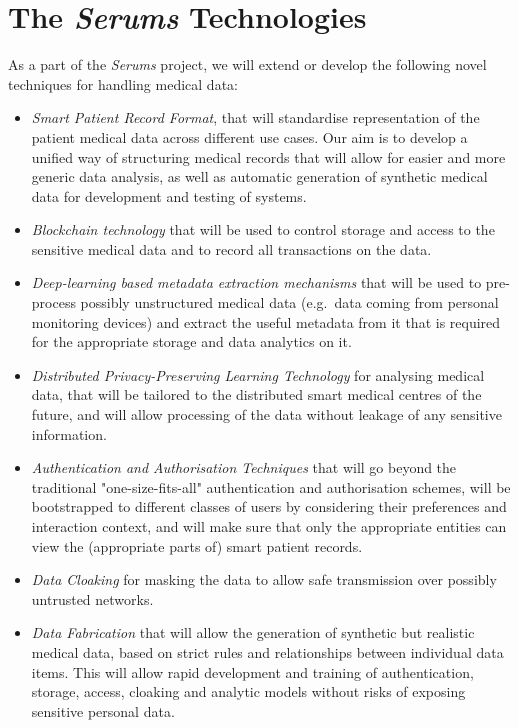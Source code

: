 \documentclass[sigconf]{acmart}
\begin{document}

\section{The \emph{Serums} Technologies}
\noindent
As a part of the \emph{Serums} project, we will extend or develop the following novel techniques for handling medical data:
\begin{itemize}
\item \emph{Smart Patient Record Format}, that will standardise representation of the patient medical data across different use cases. Our aim is to develop a unified way of structuring medical records that will allow for easier and more generic data analysis, as well as automatic generation of synthetic medical data for development and testing of systems.
\item \emph{Blockchain technology} that will be used to control storage and access to the sensitive medical data and to record all transactions on the data.
\item \emph{Deep-learning based metadata extraction mechanisms} that will be used to pre-process possibly unstructured medical data (e.g.~data coming from personal monitoring devices) and extract the useful metadata from it that is required for the appropriate storage and data analytics on it.
\item \emph{Distributed Privacy-Preserving Learning Technology} for analy\-sing medical data, that will be tailored to the distributed smart medical centres of the future, and will allow processing of the data without leakage of any sensitive information.
\item \emph{Authentication and Authorisation Techniques} that will go beyond the traditional "one-size-fits-all" authentication and authorisation schemes, will be bootstrapped to different classes of users by considering their preferences and interaction context, and will make sure that only the appropriate entities can view the (appropriate parts of) smart patient records.
\item \emph{Data Cloaking} for masking the data to allow safe transmission over possibly untrusted networks.
\item \emph{Data Fabrication} that will allow the generation of synthetic but realistic medical data, based on strict rules and relationships between individual data items. This will allow rapid development and training of authentication, storage, access, cloaking and analytic models without risks of exposing sensitive personal data.
\end{itemize}
\end{document}

